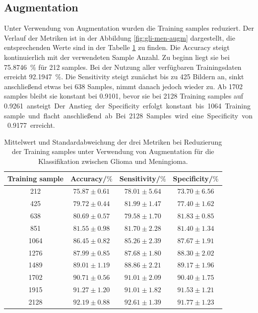 \subsection{Augmentation}
Unter Verwendung von Augmentation wurden die Training samples reduziert.
Der Verlauf der Metriken ist in der Abbildung \ref{fig:gli-men-augm} dargestellt,
die entsprechenden Werte sind in der Tabelle \ref{tab:gli-men-augm} zu finden.
Die Accuracy steigt kontinuierlich mit der verwendeten Sample Anzahl.
Zu beginn liegt sie bei \SI{75.8746}{\percent} für 212 samples. 
Bei der Nutzung aller verfügbaren Trainingsdaten erreicht \SI{92.1947}{\percent}.
Die Sensitivity steigt zunächst bis zu 425 Bildern an, sinkt anschließend etwas bei 638 Samples, nimmt danach jedoch wieder zu.
Ab 1702 samples bleibt sie konstant bei \SI{0.9101}{}, bevor sie bei 2128 Training samples auf \SI{0.9261} ansteigt. 
Der Anstieg der Specificity erfolgt konstant bis 1064 Training sample und flacht anschließend ab.
Bei 2128 Samples wird eine Specificity von \SI{0.9177}{} erreicht.
\begin{table}[H]
    \centering
    {\small
        \begin{tabular}{cccc}
            \toprule
            Training sample & Accuracy/$\%$ & Sensitivity/$\%$ & Specificity/$\%$\\
            \midrule
            212  & $75.87 \pm 0.61$ & $78.01 \pm 5.64$ & $ 73.70 \pm 6.56$ \\
            425  & $79.72 \pm 0.44$ & $81.99 \pm 1.47$ & $ 77.40 \pm 1.62$ \\
            638  & $80.69 \pm 0.57$ & $79.58 \pm 1.70$ & $ 81.83 \pm 0.85$ \\
            851  & $81.55 \pm 0.98$ & $81.70 \pm 2.28$ & $ 81.40 \pm 1.34$ \\
            1064 & $86.45 \pm 0.82$ & $85.26 \pm 2.39$ & $ 87.67 \pm 1.91$ \\
            1276 & $87.99 \pm 0.85$ & $87.68 \pm 1.80$ & $ 88.30 \pm 2.02$ \\
            1489 & $89.01 \pm 1.19$ & $88.86 \pm 2.21$ & $ 89.17 \pm 1.96$ \\
            1702 & $90.71 \pm 0.56$ & $91.01 \pm 2.09$ & $ 90.40 \pm 1.75$ \\
            1915 & $91.27 \pm 1.20$ & $91.01 \pm 1.82$ & $ 91.53 \pm 1.21$ \\
            2128 & $92.19 \pm 0.88$ & $92.61 \pm 1.39$ & $ 91.77 \pm 1.23$ \\         
            \bottomrule
        \end{tabular}}
  \caption{Mittelwert und Standardabweichung der drei Metriken bei Reduzierung der Training samples unter Verwendung von Augmentation für die Klassifikation zwischen Glioma und Meningioma.}
  \label{tab:gli-men-augm}
\end{table}
